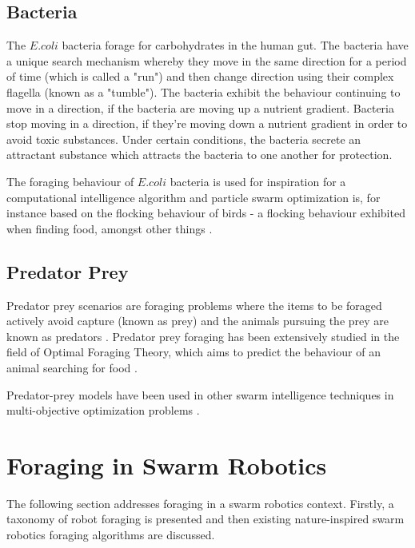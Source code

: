 \subsection{Bacteria}

The $E. coli$ bacteria forage for carbohydrates in the human gut. The bacteria have a unique search mechanism whereby they move in the same direction for a period of time (which is called a "run") and then change direction using their complex flagella (known as a "tumble"). The bacteria exhibit the behaviour continuing to move in a direction, if the bacteria are moving up a nutrient gradient. Bacteria stop moving in a direction, if they're moving down a nutrient gradient in order to avoid toxic substances. Under certain conditions, the bacteria secrete an attractant substance which attracts the bacteria to one another for protection.

The foraging behaviour of $E. coli$ bacteria is used for inspiration for a computational intelligence algorithm \cite{passino2010bacterial} and particle swarm optimization is, for instance based on the flocking behaviour of birds - a flocking behaviour exhibited when finding food, amongst other things \cite{kennedy1995particle}. 

\subsection{Predator Prey}

Predator prey scenarios are foraging problems where the items to be foraged actively avoid capture (known as prey)  and the animals pursuing the prey are known as predators \cite{winfield2009foraging}. Predator prey foraging has been extensively studied in the field of Optimal Foraging Theory, which aims to predict the behaviour of an animal searching for food \cite{charnov1976optimal}. 


Predator-prey  models have been used in other swarm intelligence techniques in multi-objective optimization problems \cite{nolfi1998coevolving}.

\section{Foraging in Swarm Robotics}
The following section addresses foraging in a swarm robotics context. Firstly, a taxonomy of robot foraging is presented and then existing nature-inspired swarm robotics foraging algorithms are discussed.

